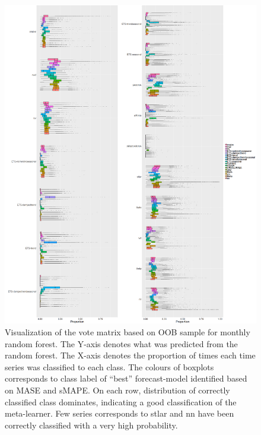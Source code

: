 \documentclass[11pt,a4paper,]{article}
\begin{document}
\clearpage

\begin{figure}
\centering
\includegraphics{figures/oobquarterlymonthly2-1.png}
\caption{\label{fig:oobquarterlymonthly2} Visualization of the vote matrix
based on OOB sample for monthly random forest. The Y-axis denotes what
was predicted from the random forest. The X-axis denotes the proportion
of times each time series was classified to each class. The colours of
boxplots corresponds to class label of ``best'' forecast-model
identified based on MASE and sMAPE. On each row, distribution of
correctly classified class dominates, indicating a good classification
of the meta-learner. Few series corresponds to stlar and nn have been
correctly classified with a very high probability.}
\end{figure}

\clearpage
\end{document}
